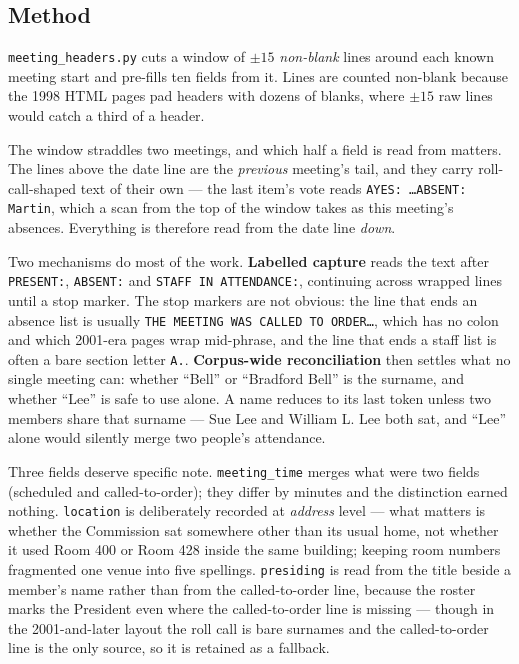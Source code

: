 \documentclass[11pt]{article}
\begin{document}
\subsection{Method}

\texttt{meeting\_headers.py} cuts a window of $\pm 15$ \emph{non-blank} lines around each
known meeting start and pre-fills ten fields from it. Lines are counted non-blank because
the 1998 HTML pages pad headers with dozens of blanks, where $\pm15$ raw lines would catch a
third of a header.

The window straddles two meetings, and which half a field is read from matters. The lines
above the date line are the \emph{previous} meeting's tail, and they carry roll-call-shaped
text of their own --- the last item's vote reads \texttt{AYES: \ldots ABSENT: Martin},
which a scan from the top of the window takes as this meeting's absences. Everything is
therefore read from the date line \emph{down}.

Two mechanisms do most of the work. \textbf{Labelled capture} reads the text after
\texttt{PRESENT:}, \texttt{ABSENT:} and \texttt{STAFF IN ATTENDANCE:}, continuing across
wrapped lines until a stop marker. The stop markers are not obvious: the line that ends an
absence list is usually \texttt{THE MEETING WAS CALLED TO ORDER\ldots}, which has no colon
and which 2001-era pages wrap mid-phrase, and the line that ends a staff list is often a
bare section letter \texttt{A.}. \textbf{Corpus-wide reconciliation} then settles what no
single meeting can: whether ``Bell'' or ``Bradford Bell'' is the surname, and whether
``Lee'' is safe to use alone. A name reduces to its last token unless two members share
that surname --- Sue Lee and William L. Lee both sat, and ``Lee'' alone would silently
merge two people's attendance.

Three fields deserve specific note. \texttt{meeting\_time} merges what were two fields
(scheduled and called-to-order); they differ by minutes and the distinction earned nothing.
\texttt{location} is deliberately recorded at \emph{address} level --- what matters is
whether the Commission sat somewhere other than its usual home, not whether it used Room
400 or Room 428 inside the same building; keeping room numbers fragmented one venue into
five spellings. \texttt{presiding} is read from the title beside a member's name rather
than from the called-to-order line, because the roster marks the President even where the
called-to-order line is missing --- though in the 2001-and-later layout the roll call is
bare surnames and the called-to-order line is the only source, so it is retained as a
fallback.
\end{document}

